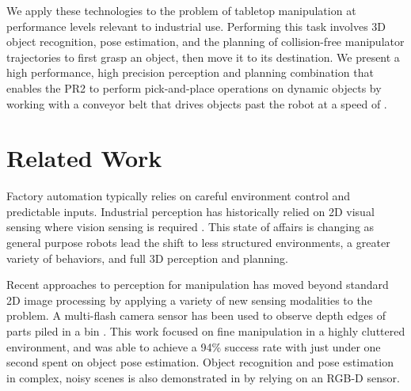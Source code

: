 \documentclass[letterpaper, 10 pt, conference]{ieeeconf}  %
\begin{document}

We apply these technologies to the problem of tabletop manipulation at
performance levels relevant to industrial use. Performing this task
involves 3D object recognition, pose estimation, and the planning of
collision-free manipulator trajectories to first grasp an object, then
move it to its destination. We present a high performance, high
precision perception and planning combination that enables the PR2 to
perform pick-and-place operations on dynamic objects by working with a
conveyor belt that drives objects past the robot at a speed of
.

\section{Related Work}
Factory automation typically relies on careful environment control and
predictable inputs. Industrial perception has historically relied on
2D visual sensing where vision sensing is required
\cite{NIST2012:BinPicking}. This state of affairs is changing as
general purpose robots lead the shift to less structured environments,
a greater variety of behaviors, and full 3D perception and planning.

Recent approaches to perception for manipulation has moved beyond
standard 2D image processing by applying a variety of new sensing
modalities to the problem. A multi-flash camera sensor has been used
to observe depth edges of parts piled in a bin
\cite{Liu2012:BinPicking}. This work focused on fine manipulation in a
highly cluttered environment, and was able to achieve a 94\% success
rate with just under one second spent on object pose
estimation. Object recognition and pose estimation in complex, noisy
scenes is also demonstrated in \cite{Papazov2012:Grasping} by relying
on an RGB-D sensor.
\end{document}
